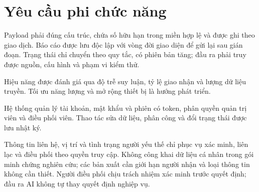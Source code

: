 \section{Yêu cầu phi chức năng}\label{sec:nonfunctional-requirements}
Payload phải đúng cấu trúc, chứa số hữu hạn trong miền hợp lệ và được ghi theo giao dịch. Báo cáo được lưu độc lập với vòng đời giao diện để gửi lại sau gián đoạn. Trạng thái chỉ chuyển theo quy tắc, có phiên bản tăng; đầu ra phải truy được nguồn, cấu hình và phạm vi kiểm thử.

Hiệu năng được đánh giá qua độ trễ suy luận, tỷ lệ giao nhận và lượng dữ liệu truyền. Tối ưu năng lượng và mở rộng thiết bị là hướng phát triển.

Hệ thống quản lý tài khoản, mật khẩu và phiên có token, phân quyền quản trị viên và điều phối viên. Thao tác sửa dữ liệu, phân công và đổi trạng thái được lưu nhật ký.

Thông tin liên hệ, vị trí và tình trạng người yếu thế chỉ phục vụ xác minh, liên lạc và điều phối theo quyền truy cập. Không công khai dữ liệu cá nhân trong gói minh chứng nghiên cứu; các bản xuất cần giới hạn người nhận và loại thông tin không cần thiết. Người điều phối chịu trách nhiệm xác minh trước quyết định; đầu ra AI không tự thay quyết định nghiệp vụ.
